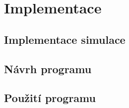\chapter{Implementace}

\section{Implementace simulace}

\section{Návrh programu}

\section{Použití programu}

